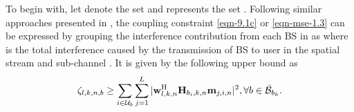 To begin with, let  denote the set  and  represents the set . Following similar approaches presented in \cite{pennanen2011decentralized,tolli2011decentralized}, the coupling constraint \eqref{eqn-9.1c} or \eqref{eqn-mse-1.3} can be expressed by grouping the interference contribution from each \ac{BS} in  as
\iftoggle{single_column}{
\begin{IEEEeqnarray}{rCl}\label{eqn-decent-3}
\beta_{l,k,n} & \geq & \sum_{\substack{j = 1\\j \neq l}}^L |\mvec{w}{l,k,n}^\herm \mvec{H}{b_k,k,n} \mvec{m}{j,k,n} |^2 \nonumber \\
&\quad& + \sum_{i \in \mc{U}_{b_k} \backslash \{k\}} \sum_{j = 1}^L |\mvec{w}{l,k,n}^\herm \mvec{H}{b_k,k,n} \mvec{m}{j,i,n} |^2 + \sum_{b \in \bar{\mc{B}}_{b_k}} \zeta_{l,k,n,b} \; + \; \enoise,
\end{IEEEeqnarray}}{\allowdisplaybreaks
\begin{multline}\label{eqn-decent-3}
	\enoise + \sum_{\substack{j = 1,j \neq l}}^L |\mvec{w}{l,k,n}^\herm \mvec{H}{b_k,k,n} \mvec{m}{j,k,n} |^2 + \sum_{b \in \bar{\mc{B}}_{b_k}} \zeta_{l,k,n,b}  \\
	+ \sum_{i \in \mc{U}_{b_k} \backslash \{k\}} \sum_{j = 1}^L |\mvec{w}{l,k,n}^\herm \mvec{H}{b_k,k,n} \mvec{m}{j,i,n} |^2 \leq \beta_{l,k,n},
\end{multline}}
where  is the total interference caused by the transmission of \ac{BS}  to user  in the spatial stream  and sub-channel . It is given by the following upper bound as
\begin{equation} \label{inter_exp}
\zeta_{l,k,n,b} \geq \sum_{i \in \mc{U}_b} \sum_{j = 1}^L |\mvec{w}{l,k,n}^\herm \mvec{H}{b_i,k,n} \mvec{m}{j,i,n} |^2, \forall b \in \bar{\mc{B}}_{b_k}.
\end{equation}

